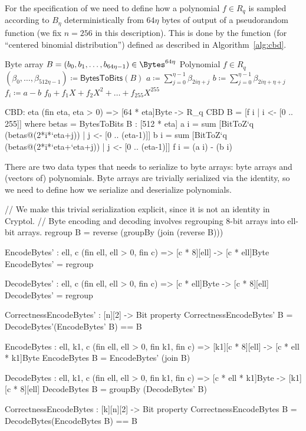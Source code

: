 For the specification of \Kyber we need to define how a polynomial $f \in R_q$ 
is sampled according to $B_\eta$ deterministically from $64\eta$ bytes of output of a
pseudorandom function (we fix $n=256$ in this description). 
This is done by the function \CBD (for ``centered binomial distribution'')
defined as described in Algorithm~\ref{alg:cbd}.

\begin{algorithm}
  \caption{$\CBD_{\eta}\colon\Bytes^{64\eta} \rightarrow R_q$
  }
  \label{alg:cbd}
  \begin{algorithmic}
    \Require Byte array $B = (b_0, b_1, \dots ,b_{64\eta-1}) \in \Bytes^{64\eta}$ 
    \Ensure Polynomial $f \in R_q$
    \State $(\beta_0,\dots,\beta_{512\eta-1}) \coloneqq \mathsf{BytesToBits}(B)$
      \State $a \coloneqq \sum_{j=0}^{\eta-1}\beta_{2i\eta+j}$
      \State $b \coloneqq \sum_{j=0}^{\eta-1}\beta_{2i\eta+\eta+j}$
      \State $f_i \coloneqq a-b$
    \EndFor
    \State \Return $f_0 + f_1X + f_2X^2 + \dots + f_{255}X^{255}$
  \end{algorithmic}
\end{algorithm}

\begin{code}
  CBD: {eta} (fin eta, eta > 0) => [64 * eta]Byte -> R_q
  CBD B = [f i | i <- [0 .. 255]]
      where betas = BytesToBits B : [512 * eta]
            a i = sum [BitToZ`{q} (betas@(2*i*`eta+j)) | j <- [0 .. (eta-1)]]
            b i = sum [BitToZ`{q} (betas@(2*i*`eta+`eta+j)) | j <- [0 .. (eta-1)]]
            f i = (a i) - (b i)
\end{code}

There are two data types that \Kyber needs to serialize to byte arrays:
byte arrays and (vectors of) polynomials. Byte arrays are trivially serialized
via the identity, so we need to define how we serialize and deserialize polynomials.

\begin{code}
  // We make this trivial serialization explicit, since it is not an identity in Cryptol.
  // Byte encoding and decoding involves regrouping 8-bit arrays into ell-bit arrays.
  regroup B = reverse (groupBy (join (reverse B)))
  
  EncodeBytes' : {ell, c} (fin ell, ell > 0, fin c) => [c * 8][ell] -> [c * ell]Byte
  EncodeBytes' = regroup

  DecodeBytes' : {ell, c} (fin ell, ell > 0, fin c) => [c * ell]Byte -> [c * 8][ell]
  DecodeBytes' = regroup

  CorrectnessEncodeBytes' : [n][2] -> Bit
  property CorrectnessEncodeBytes' B = DecodeBytes'(EncodeBytes' B) == B
  
  EncodeBytes : {ell, k1, c} (fin ell, ell > 0, fin k1, fin c) =>
      [k1][c * 8][ell] -> [c * ell * k1]Byte
  EncodeBytes B = EncodeBytes' (join B)

  DecodeBytes : {ell, k1, c} (fin ell, ell > 0, fin k1, fin c) =>
      [c * ell * k1]Byte -> [k1][c * 8][ell]
  DecodeBytes B = groupBy (DecodeBytes' B)
  
  CorrectnessEncodeBytes : [k][n][2] -> Bit
  property CorrectnessEncodeBytes B = DecodeBytes(EncodeBytes B) == B
\end{code}

